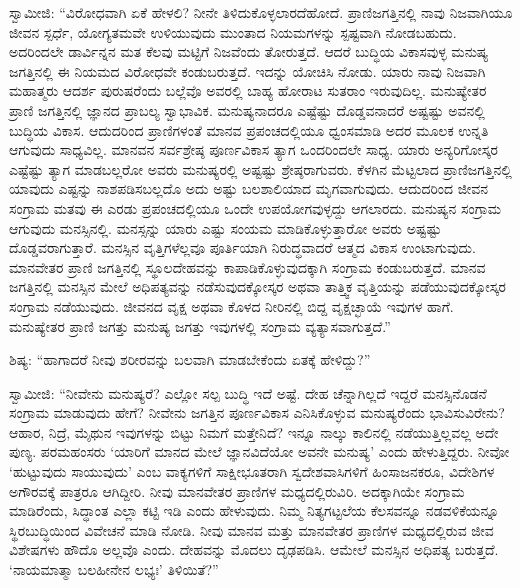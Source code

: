  ಸ್ವಾಮೀಜಿ: “ವಿರೋಧವಾಗಿ ಏಕೆ ಹೇಳಲಿ? ನೀನೇ ತಿಳಿದುಕೊಳ್ಳಲಾರದೆಹೋದೆ. ಪ್ರಾಣಿಜಗತ್ತಿನಲ್ಲಿ ನಾವು ನಿಜವಾಗಿಯೂ ಜೀವನ ಸ್ಪರ್ಧೆ, ಯೋಗ್ಯತಮವೇ ಉಳಿಯುವುದು ಮುಂತಾದ ನಿಯಮಗಳನ್ನು ಸ್ಪಷ್ಟವಾಗಿ ನೋಡಬಹುದು. ಅದರಿಂದಲೇ ಡಾರ್ವಿನ್ನನ ಮತ ಕೆಲವು ಮಟ್ಟಿಗೆ ನಿಜವೆಂದು ತೋರುತ್ತದೆ. ಆದರೆ ಬುದ್ಧಿಯ ವಿಕಾಸವುಳ್ಳ ಮನುಷ್ಯ ಜಗತ್ತಿನಲ್ಲಿ ಈ ನಿಯಮದ ವಿರೋಧವೇ ಕಂಡುಬರುತ್ತದೆ. ಇದನ್ನು ಯೋಚಿಸಿ ನೋಡು. ಯಾರು ನಾವು ನಿಜವಾಗಿ ಮಹಾತ್ಮರು ಆದರ್ಶ ಪುರುಷರೆಂದು ಬಲ್ಲೆವೊ ಅವರಲ್ಲಿ ಬಾಹ್ಯ ಹೋರಾಟ ಸುತರಾಂ ಇರುವುದಿಲ್ಲ. ಮನುಷ್ಯೇತರ ಪ್ರಾಣಿ ಜಗತ್ತಿನಲ್ಲಿ ಜ್ಞಾನದ ಪ್ರಾಬಲ್ಯ ಸ್ವಾಭಾವಿಕ. ಮನುಷ್ಯನಾದರೂ ಎಷ್ಟೆಷ್ಟು ದೊಡ್ಡವನಾದರೆ ಅಷ್ಟಷ್ಟು ಅವನಲ್ಲಿ ಬುದ್ಧಿಯ ವಿಕಾಸ. ಆದುದರಿಂದ ಪ್ರಾಣಿಗಳಂತೆ ಮಾನವ ಪ್ರಪಂಚದಲ್ಲಿಯೂ ಧ್ವಂಸಮಾಡಿ ಅದರ ಮೂಲಕ ಉನ್ನತಿ ಆಗುವುದು ಸಾಧ್ಯವಿಲ್ಲ. ಮಾನವನ ಸರ್ವಶ್ರೇಷ್ಠ ಪೂರ್ಣವಿಕಾಸ ತ್ಯಾಗ ಒಂದರಿಂದಲೇ ಸಾಧ್ಯ. ಯಾರು ಅನ್ಯರಿಗೋಸ್ಕರ ಎಷ್ಟೆಷ್ಟು ತ್ಯಾಗ ಮಾಡಬಲ್ಲರೋ ಅವರು ಮನುಷ್ಯರಲ್ಲಿ ಅಷ್ಟಷ್ಟು ಶ್ರೇಷ್ಠರಾಗುವರು. ಕೆಳಗಿನ ಮೆಟ್ಟಲಾದ ಪ್ರಾಣಿಜಗತ್ತಿನಲ್ಲಿ ಯಾವುದು ಎಷ್ಟನ್ನು ನಾಶಪಡಿಸಬಲ್ಲದೊ ಅದು ಅಷ್ಟು ಬಲಶಾಲಿಯಾದ ಮೃಗವಾಗುವುದು. ಆದುದರಿಂದ ಜೀವನ ಸಂಗ್ರಾಮ ಮತವು ಈ ಎರಡು ಪ್ರಪಂಚದಲ್ಲಿಯೂ ಒಂದೇ ಉಪಯೋಗವುಳ್ಳದ್ದು ಆಗಲಾರದು. ಮನುಷ್ಯನ ಸಂಗ್ರಾಮ ಆಗುವುದು ಮನಸ್ಸಿನಲ್ಲಿ. ಮನಸ್ಸನ್ನು ಯಾರು ಎಷ್ಟು ಸಂಯಮ ಮಾಡಿಕೊಳ್ಳುತ್ತಾರೋ ಅವರು ಅಷ್ಟಷ್ಟು ದೊಡ್ಡವರಾಗುತ್ತಾರೆ. ಮನಸ್ಸಿನ ವೃತ್ತಿಗಳೆಲ್ಲವೂ ಪೂರ್ತಿಯಾಗಿ ನಿರುದ್ಧವಾದರೆ ಆತ್ಮದ ವಿಕಾಸ ಉಂಟಾಗುವುದು. ಮಾನವೇತರ ಪ್ರಾಣಿ ಜಗತ್ತಿನಲ್ಲಿ ಸ್ಥೂಲದೇಹವನ್ನು ಕಾಪಾಡಿಕೊಳ್ಳುವುದಕ್ಕಾಗಿ ಸಂಗ್ರಾಮ ಕಂಡುಬರುತ್ತದೆ. ಮಾನವ ಜಗತ್ತಿನಲ್ಲಿ ಮನಸ್ಸಿನ ಮೇಲೆ ಅಧಿಪತ್ಯವನ್ನು ನಡೆಸುವುದಕ್ಕೋಸ್ಕರ ಅಥವಾ ತಾತ್ತ್ವಿಕ ವೃತ್ತಿಯನ್ನು ಪಡೆಯುವುದಕ್ಕೋಸ್ಕರ ಸಂಗ್ರಾಮ ನಡೆಯುವುದು. ಜೀವನದ ವೃಕ್ಷ ಅಥವಾ ಕೊಳದ ನೀರಿನಲ್ಲಿ ಬಿದ್ದ ವೃಕ್ಷಚ್ಛಾಯೆ ಇವುಗಳ ಹಾಗೆ. ಮನುಷ್ಯೇತರ ಪ್ರಾಣಿ ಜಗತ್ತು ಮನುಷ್ಯ ಜಗತ್ತು ಇವುಗಳಲ್ಲಿ ಸಂಗ್ರಾಮ ವ್ಯತ್ಯಾಸವಾಗುತ್ತದೆ.”‌ 

 ಶಿಷ್ಯ: “ಹಾಗಾದರೆ ನೀವು ಶರೀರವನ್ನು ಬಲವಾಗಿ ಮಾಡಬೇಕೆಂದು ಏತಕ್ಕೆ ಹೇಳಿದ್ದು?” 

 ಸ್ವಾಮೀಜಿ: “ನೀವೇನು ಮನುಷ್ಯರೆ? ಎಲ್ಲೋ ಸಲ್ಪ ಬುದ್ಧಿ ಇದೆ ಅಷ್ಟೆ. ದೇಹ ಚೆನ್ನಾಗಿಲ್ಲದೆ ಇದ್ದರೆ ಮನಸ್ಸಿನೊಡನೆ ಸಂಗ್ರಾಮ ಮಾಡುವುದು ಹೇಗೆ? ನೀವೇನು ಜಗತ್ತಿನ ಪೂರ್ಣವಿಕಾಸ ಎನಿಸಿಕೊಳ್ಳುವ ಮನುಷ್ಯರೆಂದು ಭಾವಿಸುವಿರೇನು? ಆಹಾರ, ನಿದ್ರೆ, ಮೈಥುನ ಇವುಗಳನ್ನು ಬಿಟ್ಟು ನಿಮಗೆ ಮತ್ತೇನಿದೆ? ಇನ್ನೂ ನಾಲ್ಕು ಕಾಲಿನಲ್ಲಿ ನಡೆಯುತ್ತಿಲ್ಲವಲ್ಲ ಅದೇ ಪುಣ್ಯ. ಪರಮಹಂಸರು ‘ಯಾರಿಗೆ ಮಾನದ ಮೇಲೆ ಜ್ಞಾನವಿದೆಯೋ ಅವನೇ ಮನುಷ್ಯ’ ಎಂದು ಹೇಳುತ್ತಿದ್ದರು. ನೀವೋ ‘ಹುಟ್ಟುವುದು ಸಾಯುವುದು’ ಎಂಬ ವಾಕ್ಯಗಳಿಗೆ ಸಾಕ್ಷೀಭೂತರಾಗಿ ಸ್ವದೇಶವಾಸಿಗಳಿಗೆ ಹಿಂಸಾಜನಕರೂ, ವಿದೇಶಿಗಳ ಅಗೌರವಕ್ಕೆ ಪಾತ್ರರೂ ಆಗಿದ್ದೀರಿ. ನೀವು ಮಾನವೇತರ ಪ್ರಾಣಿಗಳ ಮಧ್ಯದಲ್ಲಿರುವಿರಿ. ಅದಕ್ಕಾಗಿಯೇ ಸಂಗ್ರಾಮ ಮಾಡಿರೆಂದು, ಸಿದ್ಧಾಂತ ಎಲ್ಲಾ ಕಟ್ಟಿ ಇಡಿ ಎಂದು ಹೇಳುವುದು. ನಿಮ್ಮ ನಿತ್ಯಗಟ್ಟಲೆಯ ಕೆಲಸವನ್ನೂ ನಡವಳಿಕೆಯನ್ನೂ ಸ್ಥಿರಬುದ್ಧಿಯಿಂದ ವಿವೇಚನೆ ಮಾಡಿ ನೋಡಿ. ನೀವು ಮಾನವ ಮತ್ತು ಮಾನವೇತರ ಪ್ರಾಣಿಗಳ ಮಧ್ಯದಲ್ಲಿರುವ ಜೀವ ವಿಶೇಷಗಳು ಹೌದೊ ಅಲ್ಲವೊ ಎಂದು. ದೇಹವನ್ನು ಮೊದಲು ದೃಢಪಡಿಸಿ. ಆಮೇಲೆ ಮನಸ್ಸಿನ ಅಧಿಪತ್ಯ ಬರುತ್ತದೆ. ‘ನಾಯಮಾತ್ಮಾ ಬಲಹೀನೇನ ಲಭ್ಯಃ’ ತಿಳಿಯಿತೆ?” 

